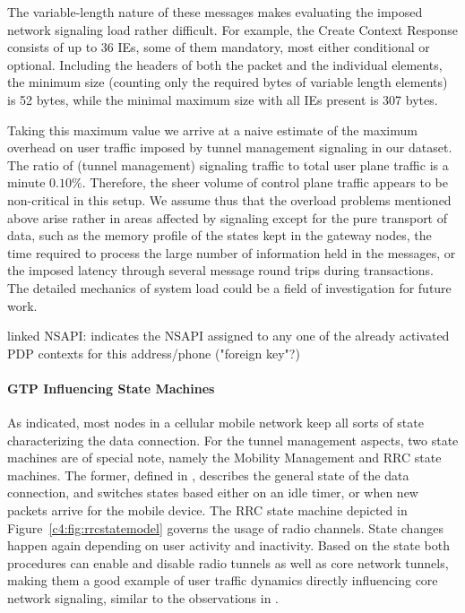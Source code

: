 The variable-length nature of these messages makes evaluating the imposed network signaling load rather difficult. For example, the Create Context Response consists of up to 36 \glspl{IE}, some of them mandatory, most either conditional or optional. Including the headers of both the packet and the individual elements, the minimum size (counting only the required bytes of variable length elements) is 52 bytes, while the minimal maximum size with all \glspl{IE} present is 307 bytes.

Taking this maximum value we arrive at a naive estimate of the maximum overhead on user traffic imposed by tunnel management signaling in our dataset. The ratio of (tunnel management) signaling traffic to total user plane traffic is a minute $0.10\%$. Therefore, the sheer volume of control plane traffic appears to be non-critical in this setup. We assume thus that the overload problems mentioned above arise rather in areas affected by signaling except for the pure transport of data, such as the memory profile of the states kept in the gateway nodes, the time required to process the large number of information held in the messages, or the imposed latency through several message round trips during transactions. The detailed mechanics of system load could be a field of investigation for future work.



linked \gls{NSAPI}: indicates the \gls{NSAPI} assigned to any one of the already activated \gls{PDP} contexts for this address/phone ("foreign key"?)

\paragraph{GTP Influencing State Machines}

As indicated, most nodes in a cellular mobile network keep all sorts of state characterizing the data connection. For the tunnel management aspects, two state machines are of special note, namely the Mobility Management and \gls{RRC} state machines.
The former, defined in \cite{3gpp.23.060}, describes the general state of the data connection, and switches states based either on an idle timer, or when new packets arrive for the mobile device. The \gls{RRC} state machine depicted in Figure~\ref{c4:fig:rrcstatemodel} governs the usage of radio channels. State changes happen again depending on user activity and inactivity.
Based on the state both procedures can enable and disable radio tunnels as well as core network tunnels, making them a good example of user traffic dynamics directly influencing core network signaling, similar to the observations in \cite{lee2007detection}.

